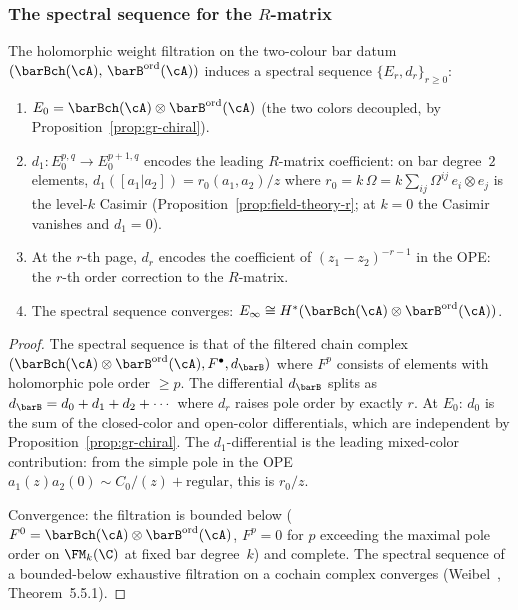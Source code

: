 \subsubsection*{The spectral sequence for the $R$-matrix}

\begin{proposition}
\label{prop:spectral-sequence-r-matrix}
The holomorphic weight filtration on the two-colour bar datum
$(\barBch(\cA),\, \barB^{\mathrm{ord}}(\cA))$
induces a spectral sequence $\{E_r, d_r\}_{r \ge 0}$:
\begin{enumerate}[label=\textup{(\roman*)}]
\item $E_0 = \barBch(\cA) \otimes \barB^{\mathrm{ord}}(\cA)$
 (the two colors decoupled, by
 Proposition~\ref{prop:gr-chiral}).
\item $d_1 \colon E_0^{p,q} \to E_0^{p+1,q}$ encodes the
 leading $R$-matrix coefficient: on bar degree~$2$ elements,
 $d_1([a_1 | a_2]) = r_0(a_1, a_2)/z$ where
 $r_0 = k\,\Omega = k\sum_{ij} \Omega^{ij}\, e_i \otimes e_j$ is the
 level-$k$ Casimir (Proposition~\ref{prop:field-theory-r};
 at $k = 0$ the Casimir vanishes and $d_1 = 0$).
\item At the $r$-th page, $d_r$ encodes the coefficient of
 $(z_1-z_2)^{-r-1}$ in the OPE: the $r$-th order correction
 to the $R$-matrix.
\item The spectral sequence converges:
 $E_\infty \cong H^\ast(\barBch(\cA) \otimes \barB^{\mathrm{ord}}(\cA))$.
\end{enumerate}
\end{proposition}

\begin{proof}
The spectral sequence is that of the filtered chain complex
$(\barBch(\cA) \otimes \barB^{\mathrm{ord}}(\cA), F^\bullet, d_{\barB})$ where
$F^p$ consists of elements with holomorphic pole order $\ge p$.
The differential $d_{\barB}$ splits as
$d_{\barB} = d_0 + d_1 + d_2 + \cdots$ where $d_r$ raises
pole order by exactly $r$. At $E_0$: $d_0$ is the sum of the
closed-color and open-color differentials, which are
independent by Proposition~\ref{prop:gr-chiral}. The
$d_1$-differential is the leading mixed-color contribution:
from the simple pole in the OPE $a_1(z) a_2(0) \sim
C_0/(z) + \mathrm{regular}$, this is $r_0/z$.

Convergence: the filtration is bounded below ($F^0 =
\barBch(\cA) \otimes \barB^{\mathrm{ord}}(\cA)$, $F^p = 0$ for $p$ exceeding the
maximal pole order on $\FM_k(\C)$ at fixed bar degree~$k$)
and complete. The spectral sequence of a bounded-below
exhaustive filtration on a cochain complex converges
(Weibel~\cite{Wei94}, Theorem~5.5.1).
\end{proof}

